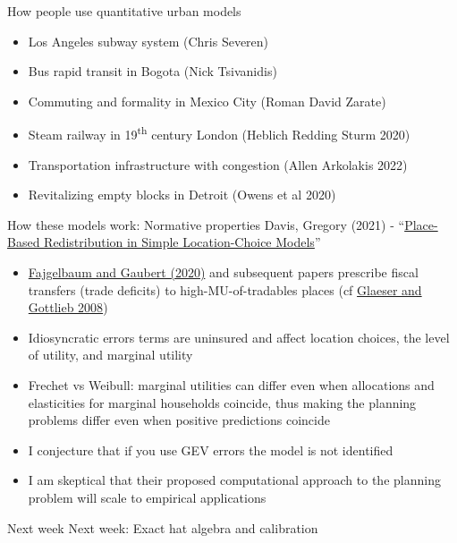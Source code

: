 \documentclass[11pt,notes=hide,aspectratio=169]{beamer}
\begin{document}
\begin{frame}{How people use quantitative urban models}
\begin{itemize}
\item Los Angeles subway system (Chris Severen)
\item Bus rapid transit in Bogota (Nick Tsivanidis)
\item Commuting and formality in Mexico City (Roman David Zarate)
\item Steam railway in 19\textsuperscript{th} century London (Heblich Redding Sturm 2020)
\item Transportation infrastructure with congestion (Allen Arkolakis 2022)
\item Revitalizing empty blocks in Detroit (Owens et al 2020)
\end{itemize}
\end{frame}
\begin{frame}{How these models work: Normative properties}
Davis, Gregory (2021) - ``\href{https://www.nber.org/papers/w29045}{Place-Based Redistribution in Simple Location-Choice Models}''
\begin{itemize}
\item
\href{https://academic.oup.com/qje/article-abstract/135/2/959/5697213}{Fajgelbaum and Gaubert (2020)} and subsequent papers
prescribe fiscal transfers (trade deficits) to high-MU-of-tradables places
(cf \href{https://www.brookings.edu/wp-content/uploads/2008/03/2008a_bpea_glaeser.pdf}{Glaeser and Gottlieb 2008})
\item
Idiosyncratic errors terms are uninsured and affect location choices, the level of utility, and marginal utility
\item 
Frechet vs Weibull:
marginal utilities can differ even when allocations and elasticities for marginal households coincide,
thus making the planning problems differ even when positive predictions coincide
\item
I conjecture that if you use GEV errors the model is not identified
\item
I am skeptical that their proposed computational approach to the planning problem will scale to empirical applications
\end{itemize}
\end{frame}
\begin{frame}{Next week}
Next week: Exact hat algebra and calibration
\end{frame}
\end{document}
